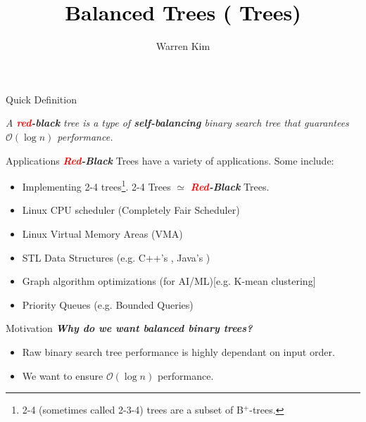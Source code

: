 \documentclass[aspectratio=169]{beamer}
\title{\textcolor{black}{Balanced Trees (\textib{\textcolor{red}{Red}}\textib{-Black} Trees)}}
\author{Warren Kim}
\date{}
\newcommand{\textib}[1]{\textit{\textbf{{#1}}}}
\newcommand{\red}{\textib{\textcolor{red}{red}}}
\newenvironment{define}{\begin{tcolorbox}[title={Definition}]\begin{small}}{\end{small}\end{tcolorbox}}
\begin{document}
\maketitle

\begin{frame}[fragile]{Quick Definition}
    \begin{define}
        \it
        {
            A \red\textib{-black} tree is a type of \textib{self-balancing} binary search tree that
            guarantees $\mathcal{O}(\log n)$ performance.
        }
    \end{define}
    \exampleone
\end{frame}


\begin{frame}{Applications}
    \textib{\textcolor{red}{Red}-Black} Trees have a variety of applications. Some include:
    \begin{itemize}[label=$\to$]
        \item Implementing 2-4 trees\footnote{2-4 (sometimes called 2-3-4) trees are a subset
            of B$^+$-trees.}. 2-4 Trees $\simeq$ \textib{\textcolor{red}{Red}-}\textib{Black} Trees.
        \item Linux CPU scheduler (Completely Fair Scheduler)
        \item Linux Virtual Memory Areas (VMA)
        \item STL Data Structures (e.g. C++'s , Java's )
        \item Graph algorithm optimizations (for AI/ML)[e.g. K-mean clustering]
        \item Priority Queues (e.g. Bounded Queries)
    \end{itemize}
\end{frame}


\begin{frame}{Motivation}
    \textib{Why do we want balanced binary trees?}
    \begin{itemize}[label=$\to$]
        \item Raw binary search tree performance is highly dependant on input order.
        \item We want to ensure $\mathcal{O}(\log n)$ performance.
    \end{itemize}
\end{frame}
\end{document}
